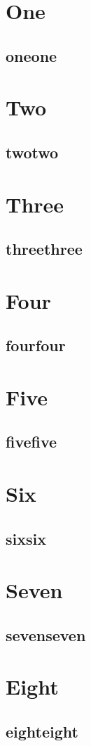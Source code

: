 \chapter{One}
\lipsum[1]
\section{oneone}
\lipsum[2-4]
\chapter{Two}
\lipsum[1]
\section{twotwo}
\lipsum[2-9]
\chapter{Three}
\lipsum[1]
\section{threethree}
\lipsum[2-4]
\chapter{Four}
\lipsum[1]
\section{fourfour}
\lipsum[2-4]
\chapter{Five}
\lipsum[1]
\section{fivefive}
\lipsum[2-4]
\chapter{Six}
\lipsum[1]
\section{sixsix}
\lipsum[2-4]
\chapter{Seven}
\lipsum[1]
\section{sevenseven}
\lipsum[2-4]
\chapter{Eight}
\lipsum[1]
\section{eighteight}